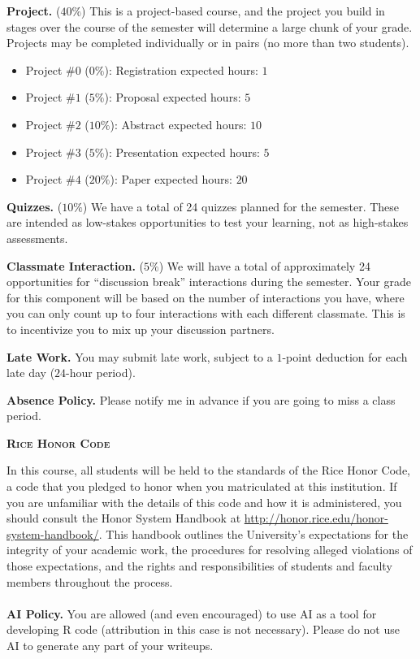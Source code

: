 \documentclass[11pt]{article}
\begin{document}
\begin{adjustwidth}{1cm}{0cm}
  \textbf{Project.} ($40\%$) This is a project-based course, and the project you build in stages over the course of the semester will determine a large chunk of your grade. Projects may be completed individually or in pairs (no more than two students).
  \begin{itemize}
    \item Project \#$0$ ($0\%$): Registration                   \hfill expected hours: $1$
    \item Project \#$1$ ($5\%$): Proposal                       \hfill expected hours: $5$
    \item Project \#$2$ ($10\%$): Abstract                      \hfill expected hours: $10$
    \item Project \#$3$ ($5\%$): Presentation                   \hfill expected hours: $5$
    \item Project \#$4$ ($20\%$): Paper                         \hfill expected hours: $20$
  \end{itemize}

  \textbf{Quizzes.} ($10\%$) We have a total of 24 quizzes planned for the semester. These are intended as low-stakes opportunities to test your learning, not as high-stakes assessments.

  \textbf{Classmate Interaction.} ($5\%$) We will have a total of approximately 24 opportunities for ``discussion break'' interactions during the semester. Your grade for this component will be based on the number of interactions you have, where you can only count up to four interactions with each different classmate. This is to incentivize you to mix up your discussion partners.

  \textbf{Late Work.} You may submit late work, subject to a $1$-point deduction for each late day ($24$-hour period).

  \textbf{Absence Policy.} Please notify me in advance if you are going to miss a class period.
\end{adjustwidth}

\newpage
\textbf{\textsc{Rice Honor Code}}
\begin{adjustwidth}{1cm}{0cm}
  In this course, all students will be held to the standards of the Rice Honor Code, a code that you pledged to honor when you matriculated at this institution. If you are unfamiliar with the details of this code and how it is administered, you should consult the Honor System Handbook at \url{http://honor.rice.edu/honor-system-handbook/}. This handbook outlines the University's expectations for the integrity of your academic work, the procedures for resolving alleged violations of those expectations, and the rights and responsibilities of students and faculty members throughout the process.\\
  ~\\
  \textbf{AI Policy.} You are allowed (and even encouraged) to use AI as a tool for developing R code (attribution in this case is not necessary). Please do not use AI to generate any part of your writeups.
\end{adjustwidth}
\end{document}
